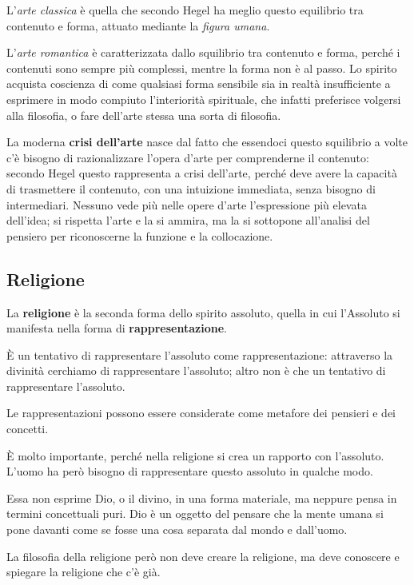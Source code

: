 \documentclass[a4paper, twoside, titlepage]{book}
\begin{document}
L’\textit{arte classica} è quella che secondo Hegel ha meglio questo equilibrio tra contenuto e forma, attuato mediante la \textit{figura umana}.

L’\textit{arte romantica} è caratterizzata dallo squilibrio tra contenuto e forma, perché i contenuti sono sempre più complessi, mentre la forma non è al passo. Lo spirito acquista coscienza di come qualsiasi forma sensibile sia in realtà insufficiente a esprimere in modo compiuto l'interiorità spirituale, che infatti preferisce volgersi alla filosofia, o fare dell'arte stessa una sorta di filosofia.

La moderna \textbf{crisi dell’arte} nasce dal fatto che essendoci questo squilibrio a volte c’è bisogno di razionalizzare l’opera d’arte per comprenderne il contenuto: secondo Hegel questo rappresenta a crisi dell’arte, perché deve avere la capacità di trasmettere il contenuto, con una intuizione immediata, senza bisogno di intermediari.
Nessuno vede più nelle opere d'arte l'espressione più elevata dell'idea; si rispetta l'arte e la si ammira, ma la si sottopone all'analisi del pensiero per riconoscerne la funzione e la collocazione.

\subsection{Religione}

La \textbf{religione} è la seconda forma dello spirito assoluto, quella in cui l'Assoluto si manifesta nella forma di \textbf{rappresentazione}.

È un tentativo di rappresentare l’assoluto come rappresentazione: attraverso la divinità cerchiamo di rappresentare l’assoluto; altro non è che un tentativo di rappresentare l’assoluto.

Le rappresentazioni possono essere considerate come metafore dei pensieri e dei concetti.

È molto importante, perché nella religione si crea un rapporto con l’assoluto. L’uomo ha però bisogno di rappresentare questo assoluto in qualche modo.

Essa non esprime Dio, o il divino, in una forma materiale, ma neppure pensa in termini concettuali puri. Dio è un oggetto del pensare che la mente umana si pone davanti come se fosse una cosa separata dal mondo e dall'uomo.

La filosofia della religione però non deve creare la religione, ma deve conoscere e spiegare la religione che c’è già.  
\end{document}
